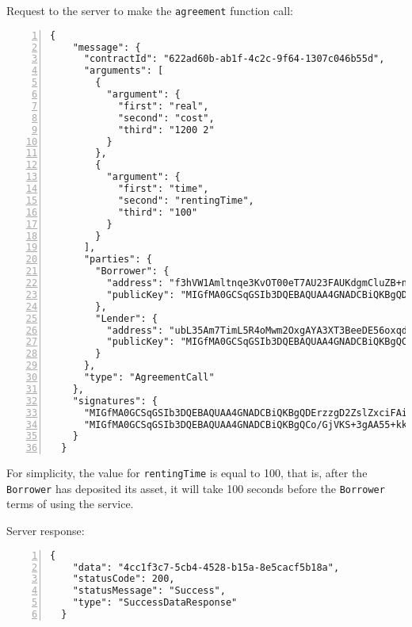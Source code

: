 Request to the server to make the \verb|agreement| function call:
\begin{Verbatim}[numbers=left,xleftmargin=1cm,firstnumber=1,breaklines=true,breakanywhere=true,tabsize=2]
  {
    "message": {
      "contractId": "622ad60b-ab1f-4c2c-9f64-1307c046b55d",
      "arguments": [
        {
          "argument": {
            "first": "real",
            "second": "cost",
            "third": "1200 2"
          }
        },
        {
          "argument": {
            "first": "time",
            "second": "rentingTime",
            "third": "100"
          }
        }
      ],
      "parties": {
        "Borrower": {
          "address": "f3hVW1Amltnqe3KvOT00eT7AU23FAUKdgmCluZB+nss=",
          "publicKey": "MIGfMA0GCSqGSIb3DQEBAQUAA4GNADCBiQKBgQDErzzgD2ZslZxciFAiX3/ot7lrkZDw4148jFZrsDZPE6CVs9xXFSHGgy/mFvIFLXhnChO6Nyd2be3lbgeavLMCMVUiTStXr117Km17keWpb3sItkKKsLFBOcIIU8XXowI/OhzQN2XPZYESHgjdQ5vwEj2YyueiS7WKP94YWz/pswIDAQAB"
        },
        "Lender": {
          "address": "ubL35Am7TimL5R4oMwm2OxgAYA3XT3BeeDE56oxqdLc=",
          "publicKey": "MIGfMA0GCSqGSIb3DQEBAQUAA4GNADCBiQKBgQCo/GjVKS+3gAA55+kko41yINdOcCLQMSBQyuTTkKHE1mhu/TgOpivM0wLPsSga8hQMr3+v3aR0IF/vfCRf6SdiXmWx/jflmEXtnT6fkGcnV6dGNUpHWXSpwUIDt0N88jfnEqekx4S+KDCKg99sGEeHeT65fKS8lB0gjHMt9AOriwIDAQAB"
        }
      },
      "type": "AgreementCall"
    },
    "signatures": {
      "MIGfMA0GCSqGSIb3DQEBAQUAA4GNADCBiQKBgQDErzzgD2ZslZxciFAiX3/ot7lrkZDw4148jFZrsDZPE6CVs9xXFSHGgy/mFvIFLXhnChO6Nyd2be3lbgeavLMCMVUiTStXr117Km17keWpb3sItkKKsLFBOcIIU8XXowI/OhzQN2XPZYESHgjdQ5vwEj2YyueiS7WKP94YWz/pswIDAQAB": "o9hrAXSkpskhxRdS+7vWSi85DhAlYlPt7EWUkYFsLOmo8ZluA0MNcLksi2FEFs3f5Gsike0nvrVCKKGVHIQLaBsDr9TgHVBEwNV7IqsvBaTuO7GaIndWmaC2T+oVKzzpuO30p5MWx4ukmZ+c3BjZrtS060qVZdfYXaa9mByBDPM=",
      "MIGfMA0GCSqGSIb3DQEBAQUAA4GNADCBiQKBgQCo/GjVKS+3gAA55+kko41yINdOcCLQMSBQyuTTkKHE1mhu/TgOpivM0wLPsSga8hQMr3+v3aR0IF/vfCRf6SdiXmWx/jflmEXtnT6fkGcnV6dGNUpHWXSpwUIDt0N88jfnEqekx4S+KDCKg99sGEeHeT65fKS8lB0gjHMt9AOriwIDAQAB": "ITY3VKqPbsLtAuSk5xabu2v9pVTaGyypMxEzxhLv+JOgoHmdkCkPV8k3JG4efJR/AdqaZrFvJWg8SGFwylWBKMP0/83GvToRdIBkfHg78v6fOzh+xVRtFH0OhPnPHNksKn9EZwidhJEiNyEKYMfT6VADhaFkjdLCXcYqjUUrKzY="
    }
  }
\end{Verbatim}

For simplicity, the value for \verb|rentingTime| is equal to 100, that is, after the \verb|Borrower| has 
deposited its asset, it will take 100 seconds before the \verb|Borrower| terms of using the service.

Server response:
\begin{Verbatim}[numbers=left,xleftmargin=1cm,firstnumber=1,breaklines=true,breakanywhere=true,tabsize=2]
  {
    "data": "4cc1f3c7-5cb4-4528-b15a-8e5cacf5b18a",
    "statusCode": 200,
    "statusMessage": "Success",
    "type": "SuccessDataResponse"
  }
\end{Verbatim}

